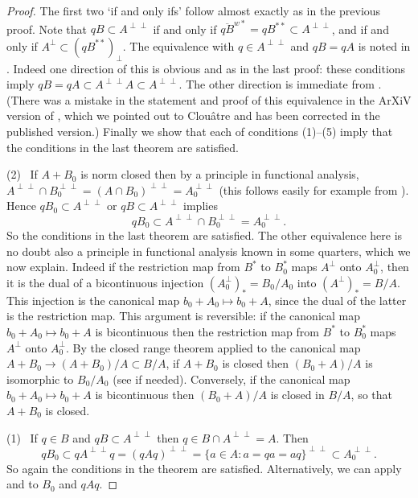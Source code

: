 \documentclass{amsart}
\theoremstyle{remark}
\theoremstyle{definition}
\numberwithin{equation}{section}
\begin{document}
\begin{proof}   The 
first two `if and only ifs' follow almost exactly as in the previous proof.   
Note that  $q B \subset A^{\perp \perp}$ if and only if $\overline{q B}^{w*} = q B^{**} \subset A^{\perp \perp}$, and  if and only if 
$A^{\perp} \subset (q B^{**})_\perp$. 
The equivalence with $q \in A^{\perp \perp}$ and $qB = qA$ is noted in  \cite[Theorem 6.2]{CT}.  Indeed one direction of this is obvious and as in the last proof: these conditions imply
$qB = qA \subset A^{\perp \perp} A \subset A^{\perp \perp}$.
The other direction is immediate from \cite[Proposition 3.4]{Hay}.   (There was a mistake in the statement and proof  of this equivalence 
  in the ArXiV version of \cite{CT}, which we pointed out to Clou\^atre and has been corrected in the published version.) 
Finally we show that each of  conditions (1)--(5) imply that the conditions in the last theorem are satisfied.

(2) \ If $A + B_0$ is norm closed then by a principle in functional analysis, $A^{\perp \perp} \cap B_0^{\perp \perp} = (A \cap B_0)^{\perp \perp} = A_0^{\perp \perp}$   
(this follows easily for example from \cite[Lemma I.1.14(a)]{HWW}).   
Hence $q B_0 \subset A^{\perp \perp}$ or $q B  \subset A^{\perp \perp}$ implies 
$$q B_0 \subset A^{\perp \perp} \cap B_0^{\perp \perp} = A_0^{\perp \perp}.$$ 
So the conditions in the last theorem are satisfied.    The other equivalence here is no doubt also a principle in functional analysis known in some 
quarters, which we now explain.   Indeed if the restriction map from $B^*$ to $B_0^*$ maps $A^\perp$   onto $A_0^\perp$,
then it is the dual of a bicontinuous injection $(A_0^\perp)_* = B_0/A_0$ into 
$(A^\perp)_* = B/A$.       This injection is the canonical map $b_0 + A_0 \mapsto b_0 + A$,
since the dual of the latter is the restriction map.    
This argument is reversible: if the canonical map $b_0 + A_0 \mapsto b_0 + A$ is bicontinuous then 
 the restriction map from $B^*$ to $B_0^*$ maps $A^\perp$   onto $A_0^\perp$.
By the closed range theorem applied to the canonical map $A+B_0 \to (A+B_0)/A \subset B/A$, if $A+B_0$ is closed then $(B_0 + A)/A$ is 
isomorphic to $B_0/A_0$ (see \cite[Lemma I.1.14]{HWW} if needed).   Conversely, if the canonical map $b_0 + A_0 \mapsto b_0 + A$
is bicontinuous then $(B_0 + A)/A$ is closed in $B/A$, so that $A+B_0$ is closed. 

(1) \ If $q \in B$ and $q B  \subset A^{\perp \perp}$  then  $q \in B \cap A^{\perp \perp} = A$.  Then 
 $$q B_0 \subset 
q A^{\perp \perp} q =  (qAq)^{\perp \perp} = \{ a \in A : a = qa = aq \}^{\perp \perp} 
\subset A_0^{\perp \perp}.$$ 
So again the conditions in the theorem are satisfied.    Alternatively, 
we can apply  \cite[Proposition 3.4]{Hay}  and \cite[Theorem 3.4]{Bnpi}  to $B_0$ and $qAq$.


\end{proof}
\end{document}
